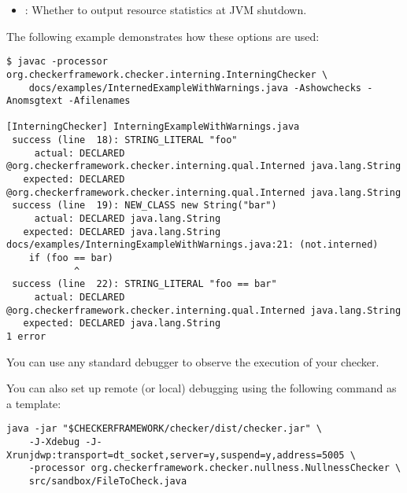 \begin{itemize}

\item {}:
  Whether to output resource statistics at JVM shutdown.

\end{itemize}



The following example demonstrates how these options are used:

\begin{smaller}
\begin{Verbatim}
$ javac -processor org.checkerframework.checker.interning.InterningChecker \
    docs/examples/InternedExampleWithWarnings.java -Ashowchecks -Anomsgtext -Afilenames

[InterningChecker] InterningExampleWithWarnings.java
 success (line  18): STRING_LITERAL "foo"
     actual: DECLARED @org.checkerframework.checker.interning.qual.Interned java.lang.String
   expected: DECLARED @org.checkerframework.checker.interning.qual.Interned java.lang.String
 success (line  19): NEW_CLASS new String("bar")
     actual: DECLARED java.lang.String
   expected: DECLARED java.lang.String
docs/examples/InterningExampleWithWarnings.java:21: (not.interned)
    if (foo == bar)
            ^
 success (line  22): STRING_LITERAL "foo == bar"
     actual: DECLARED @org.checkerframework.checker.interning.qual.Interned java.lang.String
   expected: DECLARED java.lang.String
1 error
\end{Verbatim}
\end{smaller}


You can use any standard debugger to observe the execution of your checker.

You can also set up remote (or local) debugging using the following command as a template:

\begin{Verbatim}
java -jar "$CHECKERFRAMEWORK/checker/dist/checker.jar" \
    -J-Xdebug -J-Xrunjdwp:transport=dt_socket,server=y,suspend=y,address=5005 \
    -processor org.checkerframework.checker.nullness.NullnessChecker \
    src/sandbox/FileToCheck.java

\end{Verbatim}


